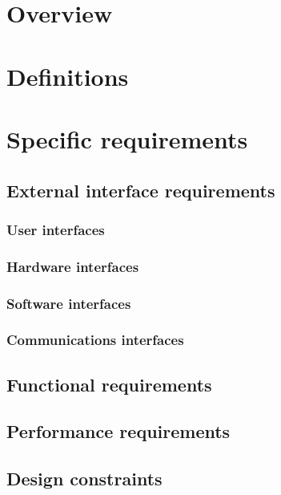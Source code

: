 \documentclass[10pt,journal,compsoc]{IEEEtran}
\begin{document}
\newpage

\section{Overview}

\vfill

\section{Definitions}

\vfill

\newpage

\section{Specific requirements}

\subsection{External interface requirements}
\subsubsection{User interfaces}
\subsubsection{Hardware interfaces}
\subsubsection{Software interfaces}
\subsubsection{Communications interfaces}

\vfill

\subsection{Functional requirements}

\vfill

\subsection{Performance requirements}

\vfill

\subsection{Design constraints}
\end{document}
